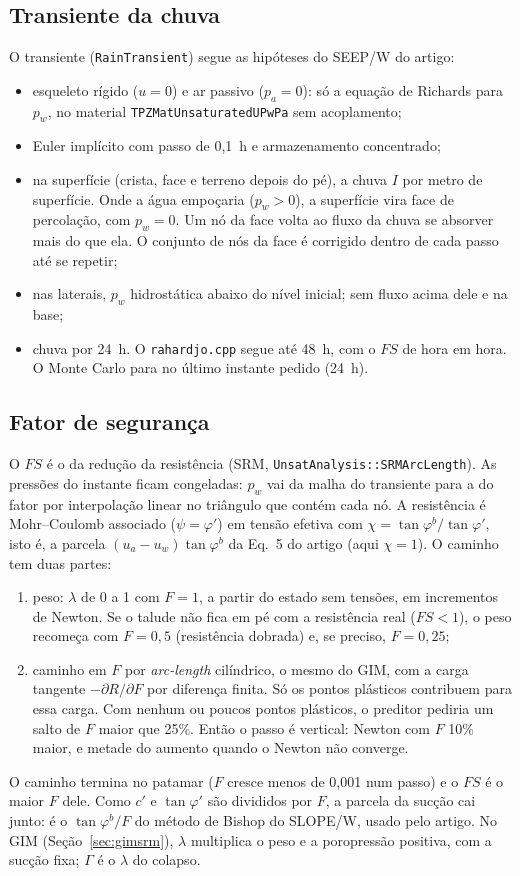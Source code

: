 \documentclass[11pt,a4paper]{article}
\begin{document}
\subsection{Transiente da chuva}
O transiente (\texttt{RainTransient}) segue as hipóteses do SEEP/W do artigo:
\begin{itemize}
\item esqueleto rígido ($u = 0$) e ar passivo ($p_a = 0$): só a equação de Richards para $p_w$, no material
\texttt{TPZMatUnsaturatedUPwPa} sem acoplamento;
\item Euler implícito com passo de 0,1~h e armazenamento concentrado;
\item na superfície (crista, face e terreno depois do pé), a chuva $I$ por metro de superfície. Onde a água empoçaria ($p_w > 0$), a
superfície vira face de percolação, com $p_w = 0$. Um nó da face volta ao fluxo da chuva se absorver mais do que ela. O
conjunto de nós da face é corrigido dentro de cada passo até se repetir;
\item nas laterais, $p_w$ hidrostática abaixo do nível inicial; sem fluxo acima dele e na base;
\item chuva por 24~h. O \texttt{rahardjo.cpp} segue até 48~h, com o $FS$ de hora em hora. O Monte Carlo para no último
instante pedido (24~h).
\end{itemize}

\subsection{Fator de segurança}
O $FS$ é o da redução da resistência (SRM, \texttt{UnsatAnalysis::SRMArcLength}). As pressões do instante ficam
congeladas: $p_w$ vai da malha do transiente para a do fator por interpolação linear no triângulo que contém cada nó. A
resistência é Mohr--Coulomb associado ($\psi = \varphi'$) em tensão efetiva com $\chi = \tan\varphi^b/\tan\varphi'$, isto
é, a parcela $(u_a - u_w)\tan\varphi^b$ da Eq.~5 do artigo (aqui $\chi = 1$). O caminho tem duas partes:
\begin{enumerate}
\item peso: $\lambda$ de 0 a 1 com $F = 1$, a partir do estado sem tensões, em incrementos de Newton. Se o talude não fica
em pé com a resistência real ($FS < 1$), o peso recomeça com $F = 0{,}5$ (resistência dobrada) e, se preciso,
$F = 0{,}25$;
\item caminho em $F$ por \emph{arc-length} cilíndrico, o mesmo do GIM, com a carga tangente $-\partial R/\partial F$ por
diferença finita. Só os pontos plásticos contribuem para essa carga. Com nenhum ou poucos pontos plásticos, o preditor
pediria um salto de $F$ maior que 25\%. Então o passo é vertical: Newton com $F$ 10\% maior, e metade do aumento quando o
Newton não converge.
\end{enumerate}
O caminho termina no patamar ($F$ cresce menos de 0,001 num passo) e o $FS$ é o maior $F$ dele. Como $c'$ e
$\tan\varphi'$ são divididos por $F$, a parcela da sucção cai junto: é o $\tan\varphi^b/F$ do método de Bishop do
SLOPE/W, usado pelo artigo. No GIM (Seção~\ref{sec:gimsrm}), $\lambda$ multiplica o peso e a poropressão positiva, com a
sucção fixa; $\Gamma$ é o $\lambda$ do colapso.
\end{document}
